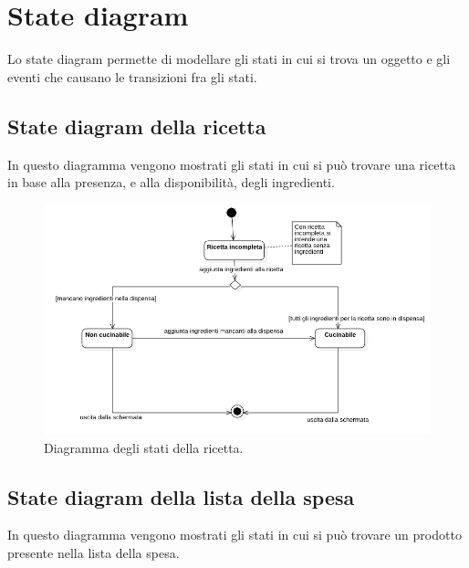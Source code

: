 \newpage

\section{State diagram}

Lo state diagram permette di modellare gli stati in cui si trova un oggetto e gli eventi che causano le transizioni fra gli stati. 

\subsection{State diagram della ricetta}

In questo diagramma vengono mostrati gli stati in cui si può trovare una ricetta in base alla presenza, e alla disponibilità, degli ingredienti.

\begin{figure}[H]
    \includegraphics[width=\linewidth]{images/state-recipe.png}
    \caption{Diagramma degli stati della ricetta.}
    \label{fig:staterecipe}
\end{figure}

\newpage

\subsection{State diagram della lista della spesa}

In questo diagramma vengono mostrati gli stati in cui si può trovare un prodotto presente nella lista della spesa.

